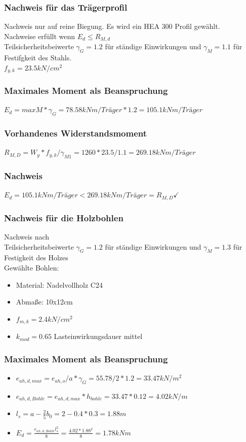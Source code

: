 \documentclass[11pt,fleqn,a4paper,halfparskip]{article}
\begin{document}
\subsubsection{Nachweis für das Trägerprofil}
Nachweis nur auf reine Biegung. Es wird ein HEA 300 Profil gewählt.\\
Nachweise erfüllt wenn $E_d \le R_{M,d}$\\
Teilsicherheitsbeiwerte $\gamma_G = 1.2$ für ständige Einwirkungen und $\gamma_M = 1.1$ für Festifgkeit des Stahls.\\
$f_{y,k} = 23.5kN/cm^2$
\subsubsection*{Maximales Moment als Beanspruchung}
$E_d = max M * \gamma_G= 78.58kNm/Träger*1.2 = 105.1kNm/Träger$
\subsubsection*{Vorhandenes Widerstandsmoment}
$R_{M,D} = W_y*f_{y,k}/\gamma_{M1} = 1260*23.5/1.1 = 269.18kNm/Träger$
\subsubsection*{Nachweis}
$E_d = 105.1kNm/Träger < 269.18kNm/Träger = R_{M,D}\checkmark$
\subsubsection{Nachweis für die Holzbohlen}
Nachweis nach \cite[S.145]{wsp}\\
Teilsicherheitsbeiwerte $\gamma_G = 1.2$ für ständige Einwirkungen und $\gamma_M = 1.3$ für Festigkeit des Holzes\\
Gewählte Bohlen:
\begin{itemize}
\item[] Material: Nadelvollholz C24
\item[] Abmaße: 10x12cm
\item[] $f_{m,k} = 2.4kN/cm^2$
\item[] $k_{mod} = 0.65$ Lasteinwirkungsdauer mittel
\end{itemize}
\subsubsection*{Maximales Moment als Beanspruchung}
\begin{itemize}
\item[] $e_{ah,d,max} = e_{ah,o}/a*\gamma_G = 55.78/2*1.2 = 33.47kN/m^2$
\item[] $e_{ah,d,Bohle} = e_{ah,d,max} * h_{bohle} = 33.47*0.12 = 4.02kN/m$
\item[] $l_s = a - \frac{2}{5}b_0 = 2 - 0.4*0.3 = 1.88m$
\item[] $E_d = \frac{e_{ah,d,Bohle}l_s^2}{8} = \frac{4.02*1.88^2}{8} = 1.78kNm$
\end{itemize}
\end{document}
